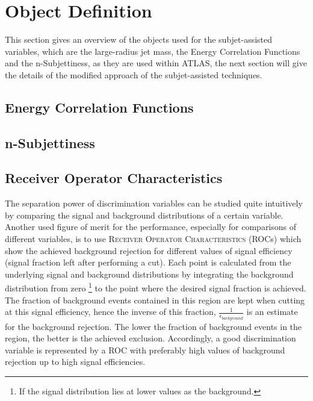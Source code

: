 \documentclass[UKenglish,texlive=2013]{\ATLASLATEXPATH atlasdoc}
\begin{document}
\section{Object Definition}
\label{sec:objdef}

This section gives an overview of the objects used for the subjet-assisted variables, which are the large-radius jet mass, the Energy Correlation Functions and the n-Subjettiness, as they are used within ATLAS, the next section will give the details of the modified approach of the subjet-assisted techniques.





\subsection{Energy Correlation Functions}\label{subsec:ECF}


\subsection{n-Subjettiness}\label{subsec:nSub}


\subsection{Receiver Operator Characteristics}\label{sec:ROC}
The separation power of discrimination variables can be studied quite intuitively by comparing the signal and background distributions of a certain variable. Another used figure of merit for the performance, especially for comparisons of different variables, is to use \textsc{Receiver Operator Characteristics} (ROCs) which show the achieved background rejection for different values of signal efficiency (signal fraction left after performing a cut). 
Each point is calculated from the underlying signal and background distributions by integrating the background distribution from zero \footnote[1]{If the signal distribution lies at lower values as the background.} to the point where the desired signal fraction is achieved. The fraction of background events contained in this region are kept when cutting at this signal efficiency, hence the inverse of this fraction, $\frac{1}{\epsilon_{background}}$ is an estimate for the background rejection. The lower the fraction of background events in the region, the better is the achieved exclusion. Accordingly, a good discrimination variable is represented by a ROC with preferably high values of background rejection up to high signal efficiencies.
\end{document}
